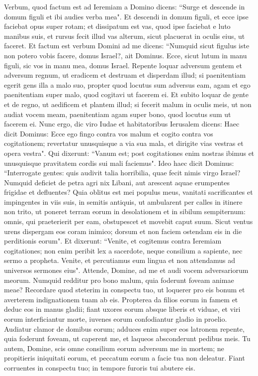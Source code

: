 \begin{biblechapter}  
\verse Verbum, quod factum est ad Ieremiam a Domino dicens: 
\verse “Surge et descende in domum figuli et ibi audies verba mea". 
\verse Et descendi in domum figuli, et ecce ipse faciebat opus super rotam; 
\verse et dissipatum est vas, quod ipse faciebat e luto manibus suis, et rursus fecit illud vas alterum, sicut placuerat in oculis eius, ut faceret. 
\verse Et factum est verbum Domini ad me dicens: 
\verse “Numquid sicut figulus iste non potero vobis facere, domus Israel?, ait Dominus. Ecce, sicut lutum in manu figuli, sic vos in manu mea, domus Israel. 
\verse Repente loquar adversum gentem et adversum regnum, ut eradicem et destruam et disperdam illud; 
\verse si paenitentiam egerit gens illa a malo suo, propter quod locutus sum adversus eam, agam et ego paenitentiam super malo, quod cogitavi ut facerem ei. 
\verse Et subito loquar de gente et de regno, ut aedificem et plantem illud; 
\verse si fecerit malum in oculis meis, ut non audiat vocem meam, paenitentiam agam super bono, quod locutus sum ut facerem ei. 
\verse Nunc ergo, dic viro Iudae et habitatoribus Ierusalem dicens: Haec dicit Dominus: Ecce ego fingo contra vos malum et cogito contra vos cogitationem; revertatur unusquisque a via sua mala, et dirigite vias vestras et opera vestra". 
\verse Qui dixerunt: “Vanum est; post cogitationes enim nostras ibimus et unusquisque pravitatem cordis sui mali faciemus". 
\verse Ideo haec dicit Dominus: “Interrogate gentes: quis audivit talia horribilia, quae fecit nimis virgo Israel? 
\verse Numquid deficiet de petra agri nix Libani, aut arescent aquae erumpentes frigidae et defluentes? 
\verse Quia oblitus est mei populus meus, vanitati sacrificantes et impingentes in viis suis, in semitis antiquis, ut ambularent per calles in itinere non trito, 
\verse ut poneret terram eorum in desolationem et in sibilum sempiternum: omnis, qui praeterierit per eam, obstupescet et movebit caput suum. 
\verse Sicut ventus urens dispergam eos coram inimico; dorsum et non faciem ostendam eis in die perditionis eorum". 
\verse Et dixerunt: “Venite, et cogitemus contra Ieremiam cogitationes; non enim peribit lex a sacerdote, neque consilium a sapiente, nec sermo a propheta. Venite, et percutiamus eum lingua et non attendamus ad universos sermones eius". 
\verse Attende, Domine, ad me et audi vocem adversariorum meorum. 
\verse Numquid redditur pro bono malum, quia foderunt foveam animae meae? Recordare quod steterim in conspectu tuo, ut loquerer pro eis bonum et averterem indignationem tuam ab eis. 
\verse Propterea da filios eorum in famem et deduc eos in manus gladii; fiant uxores eorum absque liberis et viduae, et viri eorum interficiantur morte, iuvenes eorum confodiantur gladio in proelio. 
\verse Audiatur clamor de domibus eorum; adduces enim super eos latronem repente, quia foderunt foveam, ut caperent me, et laqueos absconderunt pedibus meis. 
\verse Tu autem, Domine, scis omne consilium eorum adversum me in mortem; ne propitieris iniquitati eorum, et peccatum eorum a facie tua non deleatur. Fiant corruentes in conspectu tuo; in tempore furoris tui abutere eis. 
\end{biblechapter}

